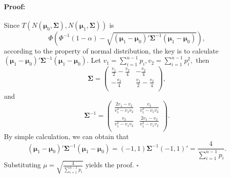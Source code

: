 \documentclass[letterpaper]{article} %
\newenvironment{proof}{\paragraph{Proof:}}{\hfill$\square$}
\begin{document}
\begin{proof}
Since  $T(N(\pmb{\mu}_0,\pmb{\Sigma}),N(\pmb{\mu}_1,\pmb{\Sigma}))$ is
$$
\Phi(\Phi^{-1}(1-\alpha)-\sqrt{(\pmb{\mu}_1-\pmb{\mu}_0)'\pmb{\Sigma}^{-1}(\pmb{\mu}_1-\pmb{\mu}_0)}),
$$
according to the property of normal distribution, the key is to calculate
$(\pmb{\mu}_1-\pmb{\mu}_0)'\pmb{\Sigma}^{-1} (\pmb{\mu}_1-\pmb{\mu}_0)$.
Let $v_1 = \sum_{i=1}^{n-1} p_i, v_2 = \sum_{i=1}^{n-1}p_i^2,$ then
$$\pmb{\Sigma} =  \left(
\begin{array}{cc}
\frac{v_1}{2}-\frac{v_2}{4} & -\frac{v_2}{4} \\
-\frac{v_2}{4} & \frac{v_1}{2}-\frac{v_2}{4} \\
\end{array}
\right),$$
and
$$\pmb{\Sigma}^{-1} =  \left(
\begin{array}{cc}
\frac{2v_1-v_2}{v_1^2-v_1v_2} & \frac{v_2}{v_1^2-v_1v_2} \\
\frac{v_2}{v_1^2-v_1v_2} & \frac{2v_1-v_2}{v_1^2-v_1v_2} \\
\end{array}
\right).$$
By simple calculation, we can obtain that
$$
(\pmb{\mu}_1-\pmb{\mu}_0)'\pmb{\Sigma}^{-1} (\pmb{\mu}_1-\pmb{\mu}_0)= (-1,1) \pmb{\Sigma}^{-1}(-1,1)' = \frac{4}{\sum_{i=1}^{n-1}p_i}.
$$
Substituting $\mu= \sqrt{\frac{4}{\sum_{i=1}^{n-1}p_i}}$ yields the proof.
\end{proof}
\end{document}
